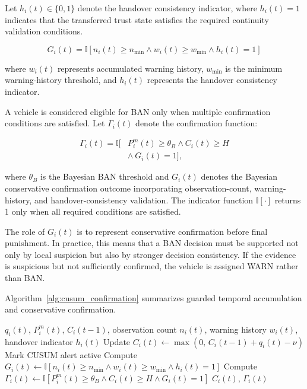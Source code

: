 \documentclass[journal]{IEEEtran}
\begin{document}
Let $h_i(t)\in\{0,1\}$ denote the handover consistency indicator, where
$h_i(t)=1$ indicates that the transferred trust state satisfies the required
continuity validation conditions.

\begin{equation}
G_i(t)=
\mathbb{I}\left[
n_i(t)\geq n_{\min}
\land w_i(t)\geq w_{\min}
\land h_i(t)=1
\right]
\label{eq:conservative_confirmation}
\end{equation}

where $w_i(t)$ represents accumulated warning history, $w_{\min}$ is the
minimum warning-history threshold, and $h_i(t)$ represents the handover
consistency indicator.

A vehicle is considered eligible for BAN only when multiple confirmation
conditions are satisfied. Let \(\Gamma_i(t)\) denote the confirmation
function:

\begin{equation}
\begin{aligned}
\Gamma_i(t)=\mathbb{I}\bigl[{}
&P_i^{m}(t)\geq \theta_B \land C_i(t)\geq H\\
&\land\ G_i(t)=1
\bigr],
\end{aligned}
\label{eq:confirmation_gate}
\end{equation}

where \(\theta_B\) is the Bayesian BAN threshold and \(G_i(t)\) denotes the
Bayesian conservative confirmation outcome incorporating observation-count,
warning-history, and handover-consistency validation. The indicator function
\(\mathbb{I}[\cdot]\) returns 1 only when all required conditions are
satisfied.

The role of \(G_i(t)\) is to represent conservative confirmation before final punishment. In practice, this means that a BAN decision must be supported not only by local suspicion but also by stronger decision consistency. If the evidence is suspicious but not sufficiently confirmed, the vehicle is assigned WARN rather than BAN.

Algorithm~\ref{alg:cusum_confirmation} summarizes guarded temporal accumulation and conservative confirmation.

\begin{algorithm}[!t]
\caption{Guarded CUSUM Accumulation and Conservative Confirmation}
\label{alg:cusum_confirmation}
\begin{algorithmic}[1]
\REQUIRE $q_i(t)$, $P_i^{m}(t)$, $C_i(t-1)$, observation count $n_i(t)$, warning history $w_i(t)$, handover indicator $h_i(t)$
\STATE Update $C_i(t) \leftarrow \max(0,\, C_i(t-1)+q_i(t)-\nu)$ 
    \STATE Mark CUSUM alert active
\ENDIF
\STATE Compute $G_i(t) \leftarrow \mathbb{I}[n_i(t)\geq n_{\min} \land w_i(t)\geq w_{\min} \land h_i(t)=1]$ 
\STATE Compute $\Gamma_i(t) \leftarrow \mathbb{I}[P_i^{m}(t)\geq\theta_B \land C_i(t)\geq H \land G_i(t)=1]$ 
\RETURN $C_i(t)$, $\Gamma_i(t)$
\end{algorithmic}
\end{algorithm}
\end{document}
